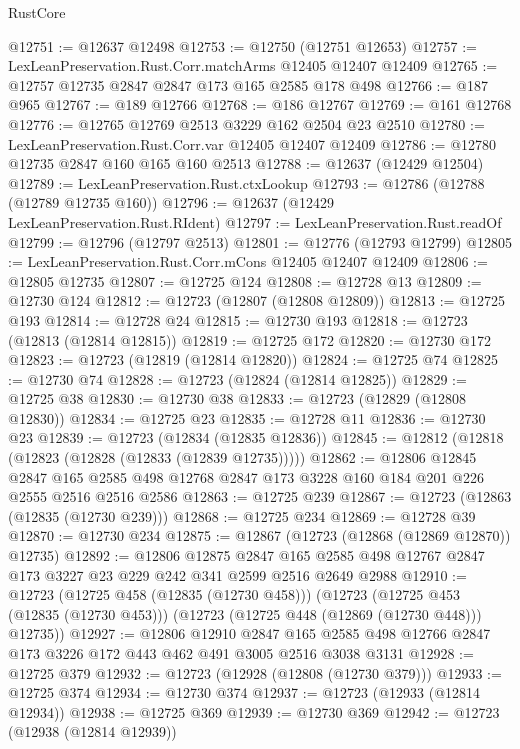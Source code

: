 \begin{lexlean}{RustCore}
\begin{coremodule}
@12751 := @12637 @12498
@12753 := @12750 (@12751 @12653)
@12757 := LexLeanPreservation.Rust.Corr.matchArms @12405 @12407 @12409
@12765 := @12757 @12735 @2847 @2847 @173 @165 @2585 @178 @498
@12766 := @187 @965
@12767 := @189 @12766
@12768 := @186 @12767
@12769 := @161 @12768
@12776 := @12765 @12769 @2513 @3229 @162 @2504 @23 @2510
@12780 := LexLeanPreservation.Rust.Corr.var @12405 @12407 @12409
@12786 := @12780 @12735 @2847 @160 @165 @160 @2513
@12788 := @12637 (@12429 @12504)
@12789 := LexLeanPreservation.Rust.ctxLookup
@12793 := @12786 (@12788 (@12789 @12735 @160))
@12796 := @12637 (@12429 LexLeanPreservation.Rust.RIdent)
@12797 := LexLeanPreservation.Rust.readOf
@12799 := @12796 (@12797 @2513)
@12801 := @12776 (@12793 @12799)
@12805 := LexLeanPreservation.Rust.Corr.mCons @12405 @12407 @12409
@12806 := @12805 @12735
@12807 := @12725 @124
@12808 := @12728 @13
@12809 := @12730 @124
@12812 := @12723 (@12807 (@12808 @12809))
@12813 := @12725 @193
@12814 := @12728 @24
@12815 := @12730 @193
@12818 := @12723 (@12813 (@12814 @12815))
@12819 := @12725 @172
@12820 := @12730 @172
@12823 := @12723 (@12819 (@12814 @12820))
@12824 := @12725 @74
@12825 := @12730 @74
@12828 := @12723 (@12824 (@12814 @12825))
@12829 := @12725 @38
@12830 := @12730 @38
@12833 := @12723 (@12829 (@12808 @12830))
@12834 := @12725 @23
@12835 := @12728 @11
@12836 := @12730 @23
@12839 := @12723 (@12834 (@12835 @12836))
@12845 := @12812 (@12818 (@12823 (@12828 (@12833 (@12839 @12735)))))
@12862 := @12806
    @12845
    @2847
    @165
    @2585
    @498
    @12768
    @2847
    @173
    @3228
    @160
    @184
    @201
    @226
    @2555
    @2516
    @2516
    @2586
@12863 := @12725 @239
@12867 := @12723 (@12863 (@12835 (@12730 @239)))
@12868 := @12725 @234
@12869 := @12728 @39
@12870 := @12730 @234
@12875 := @12867 (@12723 (@12868 (@12869 @12870)) @12735)
@12892 := @12806
    @12875
    @2847
    @165
    @2585
    @498
    @12767
    @2847
    @173
    @3227
    @23
    @229
    @242
    @341
    @2599
    @2516
    @2649
    @2988
@12910 := @12723
    (@12725 @458 (@12835 (@12730 @458)))
    (@12723
      (@12725 @453 (@12835 (@12730 @453)))
      (@12723 (@12725 @448 (@12869 (@12730 @448))) @12735))
@12927 := @12806
    @12910
    @2847
    @165
    @2585
    @498
    @12766
    @2847
    @173
    @3226
    @172
    @443
    @462
    @491
    @3005
    @2516
    @3038
    @3131
@12928 := @12725 @379
@12932 := @12723 (@12928 (@12808 (@12730 @379)))
@12933 := @12725 @374
@12934 := @12730 @374
@12937 := @12723 (@12933 (@12814 @12934))
@12938 := @12725 @369
@12939 := @12730 @369
@12942 := @12723 (@12938 (@12814 @12939))

\end{coremodule}
\end{lexlean}
